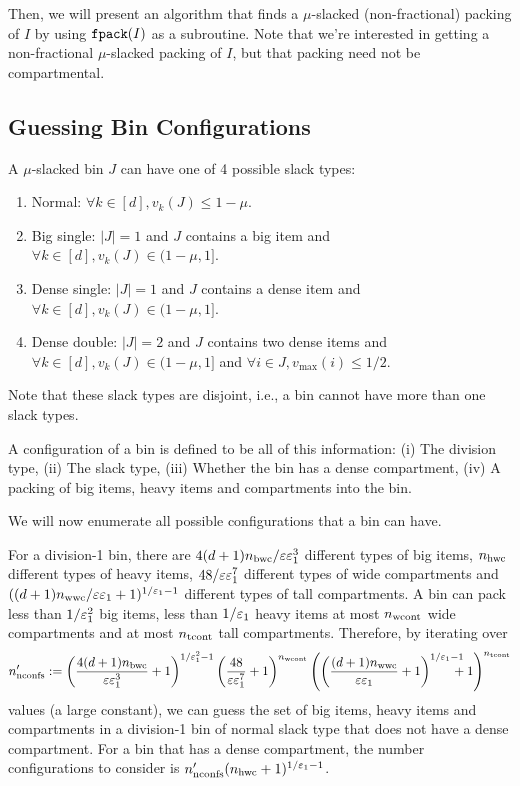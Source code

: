 Then, we will present an algorithm that finds a $\mu$-slacked
(non-fractional) packing of $I$ by using $\operatorname{\mathtt{fpack}}(I)$ as a subroutine.
Note that we're interested in getting a non-fractional $\mu$-slacked packing of $I$,
but that packing need not be compartmental.

\subsection{Guessing Bin Configurations}

A $\mu$-slacked bin $J$ can have one of 4 possible slack types:
\begin{enumerate}
\item Normal: $\forall k \in [d], v_k(J) \le 1-\mu$.
\item Big single: $|J| = 1$ and $J$ contains a big item
    and $\forall k \in [d], v_k(J) \in (1-\mu, 1]$.
\item Dense single: $|J| = 1$ and $J$ contains a dense item
    and $\forall k \in [d], v_k(J) \in (1-\mu, 1]$.
\item Dense double: $|J| = 2$ and $J$ contains two dense items
    and $\forall k \in [d], v_k(J) \in (1-\mu, 1]$
    and $\forall i \in J, v_{\max}(i) \le 1/2$.
\end{enumerate}
Note that these slack types are disjoint, i.e., a bin cannot have more than one slack types.

A configuration of a bin is defined to be all of this information:
(i) The division type,
(ii) The slack type,
(iii) Whether the bin has a dense compartment,
(iv) A packing of big items, heavy items and compartments into the bin.

We will now enumerate all possible configurations that a bin can have.

For a division-1 bin,
there are $4(d+1)n_{\mathrm{bwc}}/\varepsilon\varepsilon_1^3$ different types of big items,
$n_{\mathrm{hwc}}$ different types of heavy items,
$48/\varepsilon\varepsilon_1^7$ different types of wide compartments and
$((d+1)n_{\mathrm{wwc}}/\varepsilon\varepsilon_1 + 1)^{1/\varepsilon_1-1}$ different types of tall compartments.
A bin can pack less than $1/\varepsilon_1^2$ big items, less than $1/\varepsilon_1$ heavy items
at most $n_{\mathrm{wcont}}$ wide compartments and at most $n_{\mathrm{tcont}}$ tall compartments.
Therefore, by iterating over
\[ n_{\mathrm{nconfs}}' :=
\left(\frac{4(d+1)n_{\mathrm{bwc}}}{\varepsilon\varepsilon_1^3} + 1\right)^{1/\varepsilon_1^2-1}
\left(\frac{48}{\varepsilon\varepsilon_1^7} + 1\right)^{n_{\mathrm{wcont}}}
\left(\left(\frac{(d+1)n_{\mathrm{wwc}}}{\varepsilon\varepsilon_1}+1\right)^{1/\varepsilon_1-1}
    \hspace{-1em}+ 1\right)^{n_{\mathrm{tcont}}} \]
values (a large constant), we can guess the set of big items, heavy items and compartments
in a division-1 bin of normal slack type that does not have a dense compartment.
For a bin that has a dense compartment, the number configurations to consider is
$n_{\mathrm{nconfs}}'(n_{\mathrm{hwc}} + 1)^{1/\varepsilon_1-1}$.

